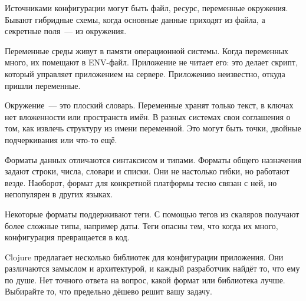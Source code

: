 Источниками конфигурации могут быть файл, ресурс, переменные окружения. Бывают
гибридные схемы, когда основные данные приходят из файла, а секретные поля~--- из
окружения.

Переменные среды живут в памяти операционной системы. Когда переменных много, их
помещают в ENV-файл. Приложение не читает его: это делает скрипт, который
управляет приложением на сервере. Приложению неизвестно, откуда пришли
переменные.

Окружение~--- это плоский словарь. Переменные хранят только текст, в ключах нет
вложенности или пространств имён. В разных системах свои соглашения о том, как
извлечь структуру из имени переменной. Это могут быть точки, двойные
подчеркивания или что-то ещё.

Форматы данных отличаются синтаксисом и типами. Форматы общего назначения задают
строки, числа, словари и списки. Они не настолько гибки, но работают
везде. Наоборот, формат для конкретной платформы тесно связан с ней, но непопулярен в других языках.

Некоторые форматы поддерживают теги. С помощью тегов из скаляров получают более
сложные типы, например даты. Теги опасны тем, что когда их много, конфигурация
превращается в код.

Clojure предлагает несколько библиотек для конфигурации приложения. Они
различаются замыслом и архитектурой, и каждый разработчик найдёт то, что ему по
душе. Нет точного ответа на вопрос, какой формат или библиотека лучше. Выбирайте
то, что предельно дёшево решит вашу задачу.
